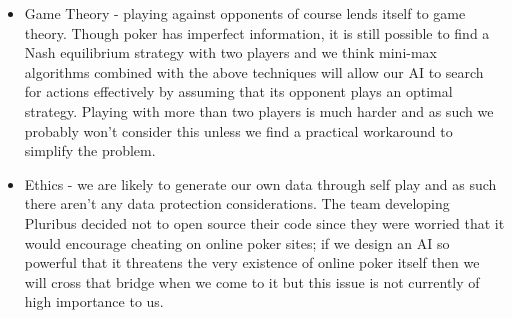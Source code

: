 \documentclass{article}
\begin{document}
\begin{multicols*}{2}
\begin{itemize}
    \item Game Theory - playing against opponents of course lends itself to game theory. Though poker has imperfect information, it is still possible to find a Nash equilibrium strategy with two players and we think mini-max algorithms combined with the above techniques will allow our AI to search for actions effectively by assuming that its opponent plays an optimal strategy. Playing with more than two players is much harder and as such we probably won't consider this unless we find a practical workaround to simplify the problem.
    \item Ethics - we are likely to generate our own data through self play and as such there aren't any data protection considerations. The team developing Pluribus decided not to open source their code since they were worried that it would encourage cheating on online poker sites; if we design an AI so powerful that it threatens the very existence of online poker itself then we will cross that bridge when we come to it but this issue is not currently of high importance to us.
\end{itemize}

\end{multicols*}
\end{document}
